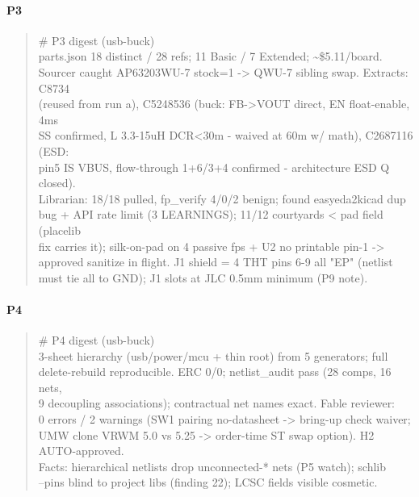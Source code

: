 \documentclass[11pt,a4paper]{article}
\begin{document}
\paragraph*{P3}
\begin{quote}\small\ttfamily\raggedright
\# P3 digest (usb-buck)\\
parts.json 18 distinct / 28 refs; 11 Basic / 7 Extended; \textasciitilde{}\$5.11/board.\\
Sourcer caught AP63203WU-7 stock=1 -\textgreater{} QWU-7 sibling swap. Extracts: C8734\\
(reused from run a), C5248536 (buck: FB-\textgreater{}VOUT direct, EN float-enable, 4ms\\
SS confirmed, L 3.3-15uH DCR\textless{}30m - waived at 60m w/ math), C2687116 (ESD:\\
pin5 IS VBUS, flow-through 1+6/3+4 confirmed - architecture ESD Q closed).\\
Librarian: 18/18 pulled, fp\_verify 4/0/2 benign; found easyeda2kicad dup\\
bug + API rate limit (3 LEARNINGS); 11/12 courtyards \textless{} pad field (placelib\\
fix carries it); silk-on-pad on 4 passive fps + U2 no printable pin-1 -\textgreater{}\\
approved sanitize in flight. J1 shield = 4 THT pins 6-9 all "EP" (netlist\\
must tie all to GND); J1 slots at JLC 0.5mm minimum (P9 note).
\end{quote}
\paragraph*{P4}
\begin{quote}\small\ttfamily\raggedright
\# P4 digest (usb-buck)\\
3-sheet hierarchy (usb/power/mcu + thin root) from 5 generators; full\\
delete-rebuild reproducible. ERC 0/0; netlist\_audit pass (28 comps, 16 nets,\\
9 decoupling associations); contractual net names exact. Fable reviewer:\\
0 errors / 2 warnings (SW1 pairing no-datasheet -\textgreater{} bring-up check waiver;\\
UMW clone VRWM 5.0 vs 5.25 -\textgreater{} order-time ST swap option). H2 AUTO-approved.\\
Facts: hierarchical netlists drop unconnected-{*} nets (P5 watch); schlib\\
--pins blind to project libs (finding 22); LCSC fields visible cosmetic.
\end{quote}
\end{document}
